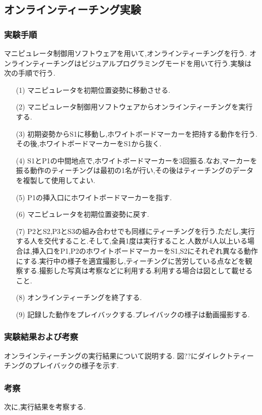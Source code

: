 \subsection{オンラインティーチング実験}

\subsubsection{実験手順}
マニピュレータ制御用ソフトウェアを用いて,オンラインティーチングを行う.
オンラインティーチングはビジュアルプログラミングモードを用いて行う.実験は次の手順で行う.

\begin{enumerate}
  \item[(1)] マニピュレータを初期位置姿勢に移動させる.
  \item[(2)] マニピュレータ制御用ソフトウェアからオンラインティーチングを実行する.
  \item[(3)] 初期姿勢からS1に移動し,ホワイトボードマーカーを把持する動作を行う.その後,ホワイトボードマーカーをS1から抜く.
  \item[(4)] S1とP1の中間地点で,ホワイトボードマーカーを3回振る.なお,マーカーを振る動作のティーチングは最初の1名が行い,その後はティーチングのデータを複製して使用してよい.
  \item[(5)] P1の挿入口にホワイトボードマーカーを指す.
  \item[(6)] マニピュレータを初期位置姿勢に戻す.
  \item[(7)] P2とS2,P3とS3の組み合わせでも同様にティーチングを行う.ただし,実行する人を交代すること.そして,全員1度は実行すること.人数が4人以上いる場合は,挿入口をP1,P2のホワイトボードマーカーをS1,S2にそれぞれ異なる動作にする.実行中の様子を適宜撮影し,ティーチングに苦労している点などを観察する.撮影した写真は考察などに利用する.利用する場合は図として載せること.
  \item[(8)] オンラインティーチングを終了する.
  \item[(9)] 記録した動作をプレイバックする.プレイバックの様子は動画撮影する.
\end{enumerate}

\subsubsection{実験結果および考察}
オンラインティーチングの実行結果について説明する.
図??にダイレクトティーチングのプレイバックの様子を示す.

\subsubsection{考察}
次に,実行結果を考察する.


